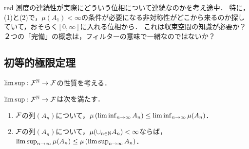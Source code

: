 \documentclass[uplatex,dvipdfmx]{jsreport}
\begin{document}
\begin{tbox}{red}{}
    測度の連続性が実際にどういう位相について連続なのかを考え途中．
    特に，(1)と(2)で，$\mu(A_1)<\infty$の条件が必要になる非対称性がどこから来るのか探していて，おそらく$[0,\infty]$に入れる位相から．
    これは収束空間の知識が必要か？２つの「完備」の概念は，フィルターの意味で一緒なのではないか？
\end{tbox}

\subsection{初等的極限定理}

\begin{tcolorbox}[colframe=ForestGreen, colback=ForestGreen!10!white,breakable,colbacktitle=ForestGreen!40!white,coltitle=black,fonttitle=\bfseries\sffamily,
title=有界測度論の初等的な結論に，確率論的な解釈を与えることが出来る．]
    $\limsup:\mathcal{F}^{\mathbb{N}}\to\mathcal{F}$の性質を考える．
\end{tcolorbox}

\begin{proposition}[集合に関するFatouの補題]
    $\limsup:\mathcal{F}^{\mathbb{N}}\to\mathcal{F}$は次を満たす．
    \begin{enumerate}
        \item $\mathcal{F}$の列$(A_n)$について，$\mu\left(\liminf_{n\to\infty}A_n\right)\le\liminf_{n\to\infty}\mu(A_n)$．
        \item $\mathcal{F}$の列$(A_n)$について，$\mu(\cup_{n\in\mathbb{N}}A_n)<\infty$ならば，$\limsup_{n\to\infty}\mu(A_n)\le\mu\left(\limsup_{n\to\infty}A_n\right)$．
    \end{enumerate}
\end{proposition}
\end{document}
